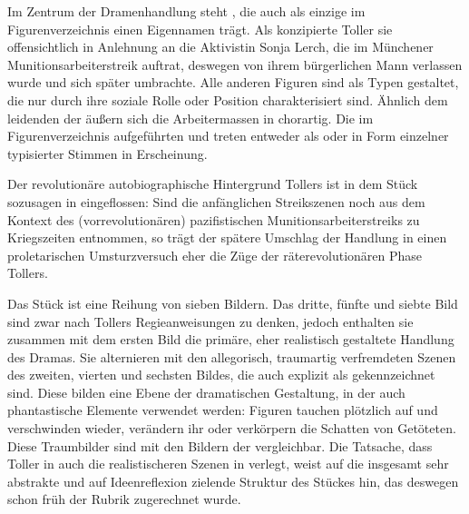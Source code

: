 Im Zentrum der Dramenhandlung steht \Cite{die Frau}, die auch als
einzige im Figurenverzeichnis einen Eigennamen trägt. Als \Cite{Sonja Irene
  L.} konzipierte Toller sie offensichtlich in Anlehnung an die Aktivistin
Sonja Lerch, die im Münchener Munitionsarbeiterstreik auftrat, deswegen von
ihrem bürgerlichen Mann verlassen wurde und sich später umbrachte. Alle
anderen Figuren sind als Typen gestaltet, die nur durch ihre soziale Rolle
oder Position charakterisiert sind. Ähnlich dem leidenden \Cite{Volk} der
 äußern sich die Arbeitermassen in  chorartig. Die im Figurenverzeichnis aufgeführten \Cite{Arbeiter}
und \Cite{Arbeiterinnen} treten entweder als \Cite{Massenchöre} oder in Form
einzelner typisierter Stimmen in Erscheinung.

Der revolutionäre autobiographische Hintergrund Tollers ist in dem Stück
sozusagen in  eingeflossen: Sind die
anfänglichen Streikszenen noch aus dem Kontext des (vorrevolutionären) 
pazifistischen Munitionsarbeiterstreiks zu
Kriegszeiten entnommen, so trägt der spätere Umschlag der Handlung in einen
proletarischen Umsturzversuch eher die Züge der räterevolutionären Phase Tollers.   

Das Stück ist eine Reihung von sieben Bildern. Das dritte, fünfte und
siebte Bild sind zwar nach Tollers Regieanweisungen \Cite{in visionärer
  Traumferne} zu denken, jedoch enthalten sie zusammen mit dem ersten Bild die
primäre, eher realistisch gestaltete Handlung des Dramas. Sie alternieren
mit den allegorisch, traumartig verfremdeten Szenen des zweiten, vierten und
sechsten Bildes, die auch explizit als \Cite{Traumbilder} gekennzeichnet sind. 
Diese bilden eine Ebene der dramatischen Gestaltung, in der auch
phantastische Elemente verwendet werden: Figuren tauchen plötzlich auf und
verschwinden wieder, verändern ihr \Cite{Antlitz} oder verkörpern die Schatten
von Getöteten. 
Diese Traumbilder sind mit den \Cite{traumfernen} Bildern der
 vergleichbar. Die Tatsache, dass Toller in 
auch die realistischeren Szenen in \Cite{visionäre Traumferne} verlegt, weist
auf die insgesamt sehr abstrakte und auf Ideenreflexion zielende Struktur des
Stückes hin, das deswegen schon früh der Rubrik \Cite{Ideendrama} zugerechnet
wurde.

